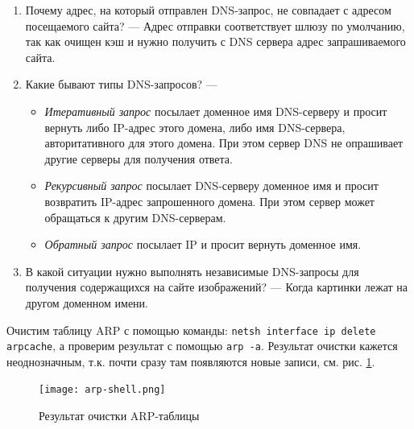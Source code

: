 \begin{enumerate}
    \item Почему адрес, на который отправлен DNS-запрос, не совпадает с 
адресом посещаемого сайта? --- Адрес отправки соответствует шлюзу по умолчанию, так как очищен кэш и нужно получить с DNS сервера адрес запрашиваемого сайта.
    \item Какие бывают типы DNS-запросов? --- \begin{itemize}
            \item \textit{Итеративный запрос} посылает доменное имя DNS-серверу и просит вернуть либо IP-адрес этого домена, либо имя DNS-сервера, авторитативного для этого домена. При этом сервер DNS не опрашивает другие серверы для получения ответа. 
            \item \textit{Рекурсивный запрос} посылает DNS-серверу доменное имя и просит возвратить IP-адрес запрошенного домена. При этом сервер может обращаться к другим DNS-серверам.
            \item \textit{Обратный запрос} посылает IP и просит вернуть доменное имя.
        \end{itemize}
    \item В какой ситуации нужно выполнять независимые DNS-запросы для 
получения содержащихся на сайте изображений? --- Когда картинки лежат на другом доменном имени.
\end{enumerate}


Очистим таблицу ARP с помощью команды: \verb|netsh interface ip delete arpcache|\;, а проверим результат с помощью \verb|arp -a|\;. Результат очистки кажется неоднозначным, т.к. почти сразу там появляются новые записи, см. рис. \ref{fig:arp-shell}.

\begin{figure}[h]
    \centering
    \texttt{[image: arp-shell.png]}
    \caption{Результат очистки ARP-таблицы}
    \label{fig:arp-shell}
\end{figure}

